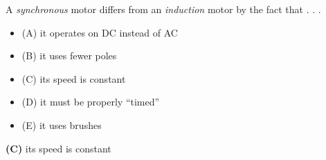 

A {\it synchronous} motor differs from an {\it induction} motor by the fact that . . .

\begin{itemize}
\item{(A)} it operates on DC instead of AC
\vskip 5pt 
\item{(B)} it uses fewer poles
\vskip 5pt 
\item{(C)} its speed is constant
\vskip 5pt 
\item{(D)} it must be properly ``timed'' 
\vskip 5pt 
\item{(E)} it uses brushes
\end{itemize}







{\bf (C)} its speed is constant











